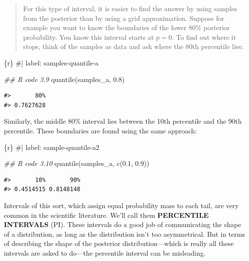 \documentclass[
  letterpaper,
  DIV=11,
  numbers=noendperiod]{scrreprt}
\newenvironment{Shaded}{\begin{snugshade}}{\end{snugshade}}
\newcommand{\CommentTok}[1]{\textcolor[rgb]{0.37,0.37,0.37}{#1}}
\newcommand{\DocumentationTok}[1]{\textcolor[rgb]{0.37,0.37,0.37}{\textit{#1}}}
\newcommand{\FloatTok}[1]{\textcolor[rgb]{0.68,0.00,0.00}{#1}}
\newcommand{\FunctionTok}[1]{\textcolor[rgb]{0.28,0.35,0.67}{#1}}
\newcommand{\InformationTok}[1]{\textcolor[rgb]{0.37,0.37,0.37}{#1}}
\newcommand{\NormalTok}[1]{\textcolor[rgb]{0.00,0.23,0.31}{#1}}
\begin{document}
\begin{quote}
For this type of interval, it is easier to find the answer by using
samples from the posterior than by using a grid approximation. Suppose
for example you want to know the boundaries of the lower 80\% posterior
probability. You know this interval starts at \(p = 0\). To find out
where it stops, think of the samples as data and ask where the 80th
percentile lies:
\end{quote}

\begin{Shaded}
\begin{Highlighting}[]
\InformationTok{\textasciigrave{}\textasciigrave{}\textasciigrave{}\{r\}}
\CommentTok{\#| label: samples{-}quantile{-}a}

\DocumentationTok{\#\# R code 3.9}
\FunctionTok{quantile}\NormalTok{(samples\_a, }\FloatTok{0.8}\NormalTok{)}
\InformationTok{\textasciigrave{}\textasciigrave{}\textasciigrave{}}
\end{Highlighting}
\end{Shaded}

\begin{verbatim}
#>       80% 
#> 0.7627628
\end{verbatim}

Similarly, the middle 80\% interval lies between the 10th percentile and
the 90th percentile. These boundaries are found using the same approach:

\begin{Shaded}
\begin{Highlighting}[]
\InformationTok{\textasciigrave{}\textasciigrave{}\textasciigrave{}\{r\}}
\CommentTok{\#| label: sample{-}quantile{-}a2}

\DocumentationTok{\#\# R code 3.10}
\FunctionTok{quantile}\NormalTok{(samples\_a, }\FunctionTok{c}\NormalTok{(}\FloatTok{0.1}\NormalTok{, }\FloatTok{0.9}\NormalTok{))}
\InformationTok{\textasciigrave{}\textasciigrave{}\textasciigrave{}}
\end{Highlighting}
\end{Shaded}

\begin{verbatim}
#>       10%       90% 
#> 0.4514515 0.8148148
\end{verbatim}

Intervals of this sort, which assign equal probability mass to each
tail, are very common in the scientific literature. We'll call them
\textbf{PERCENTILE INTERVALS} (PI). These intervals do a good job of
communicating the shape of a distribution, as long as the distribution
isn't too asymmetrical. But in terms of describing the shape of the
posterior distribution---which is really all these intervals are asked
to do---the percentile interval can be misleading.
\end{document}
